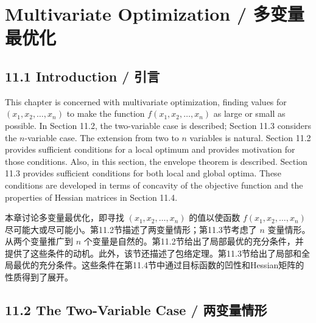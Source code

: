 \section{Multivariate Optimization / 多变量最优化}

\subsection{11.1 Introduction / 引言}

\begin{original}
This chapter is concerned with multivariate optimization, finding values for $(x_1, x_2, \ldots, x_n)$ to make the function $f(x_1, x_2, \ldots, x_n)$ as large or small as possible. In Section 11.2, the two-variable case is described; Section 11.3 considers the $n$-variable case. The extension from two to $n$ variables is natural. Section 11.2 provides sufficient conditions for a local optimum and provides motivation for those conditions. Also, in this section, the envelope theorem is described. Section 11.3 provides sufficient conditions for both local and global optima. These conditions are developed in terms of concavity of the objective function and the properties of Hessian matrices in Section 11.4.
\end{original}
\begin{translation}
本章讨论多变量最优化，即寻找 $(x_1, x_2, \ldots, x_n)$ 的值以使函数 $f(x_1, x_2, \ldots, x_n)$ 尽可能大或尽可能小。第11.2节描述了两变量情形；第11.3节考虑了 $n$ 变量情形。从两个变量推广到 $n$ 个变量是自然的。第11.2节给出了局部最优的充分条件，并提供了这些条件的动机。此外，该节还描述了包络定理。第11.3节给出了局部和全局最优的充分条件。这些条件在第11.4节中通过目标函数的凹性和Hessian矩阵的性质得到了展开。
\end{translation}

\subsection{11.2 The Two-Variable Case / 两变量情形}

